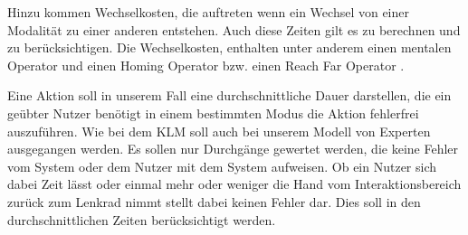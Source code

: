 Hinzu kommen Wechselkosten, die auftreten wenn ein Wechsel von einer Modalität zu einer anderen entstehen. 
Auch diese Zeiten gilt es zu berechnen und zu berücksichtigen.
Die Wechselkosten, enthalten unter anderem einen mentalen Operator und einen Homing Operator \citep{Card_1980} bzw. einen Reach Far Operator \citep{Green_2002}. 

Eine Aktion soll in unserem Fall eine durchschnittliche Dauer darstellen, die ein geübter Nutzer benötigt in einem bestimmten Modus die Aktion fehlerfrei auszuführen. 
Wie bei dem KLM soll auch bei unserem Modell von Experten ausgegangen werden. 
Es sollen nur Durchgänge gewertet werden, die keine Fehler vom System oder dem Nutzer mit dem System aufweisen.
Ob ein Nutzer sich dabei Zeit lässt oder einmal mehr oder weniger die Hand vom Interaktionsbereich zurück zum Lenkrad nimmt stellt dabei keinen Fehler dar.
Dies soll in den durchschnittlichen Zeiten berücksichtigt werden.
